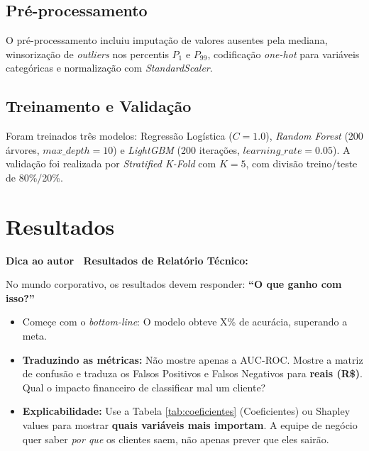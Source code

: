 \documentclass[
    article,
    12pt,
    oneside,
    a4paper,
    english,
    brazilian
    ]{abntex2}
\numberwithin{equation}{section}
\newenvironment{dica}{%
    \par\medskip
    \color{blue!60!black}\small\itshape
}{%
    \par\medskip
}
\begin{document}


\subsection{Pré-processamento}

O pré-processamento incluiu imputação de valores ausentes pela mediana, winsorização de \textit{outliers} nos percentis $P_1$ e $P_{99}$, codificação \textit{one-hot} para variáveis categóricas e normalização com \textit{StandardScaler}.

\subsection{Treinamento e Validação}

Foram treinados três modelos: Regressão Logística ($C = 1.0$), \textit{Random Forest} (200 árvores, $max\_depth = 10$) e \textit{LightGBM} (200 iterações, $learning\_rate = 0.05$). A validação foi realizada por \textit{Stratified K-Fold} com $K = 5$, com divisão treino/teste de 80\%/20\%.

\section{Resultados}

\begin{dica}
\noindent\textbf{Dica ao autor \textemdash\ Resultados de Relatório Técnico:}

No mundo corporativo, os resultados devem responder: \textbf{``O que ganho com isso?''}
\begin{itemize}
    \item Começe com o \textit{bottom-line}: O modelo obteve X\% de acurácia, superando a meta.
    \item \textbf{Traduzindo as métricas:} Não mostre apenas a AUC-ROC. Mostre a matriz de confusão e traduza os Falsos Positivos e Falsos Negativos para \textbf{reais (R\$)}. Qual o impacto financeiro de classificar mal um cliente?
    \item \textbf{Explicabilidade:} Use a Tabela \ref{tab:coeficientes} (Coeficientes) ou Shapley values para mostrar \textbf{quais variáveis mais importam}. A equipe de negócio quer saber \textit{por que} os clientes saem, não apenas prever que eles sairão.
\end{itemize}
\end{dica}
\end{document}
